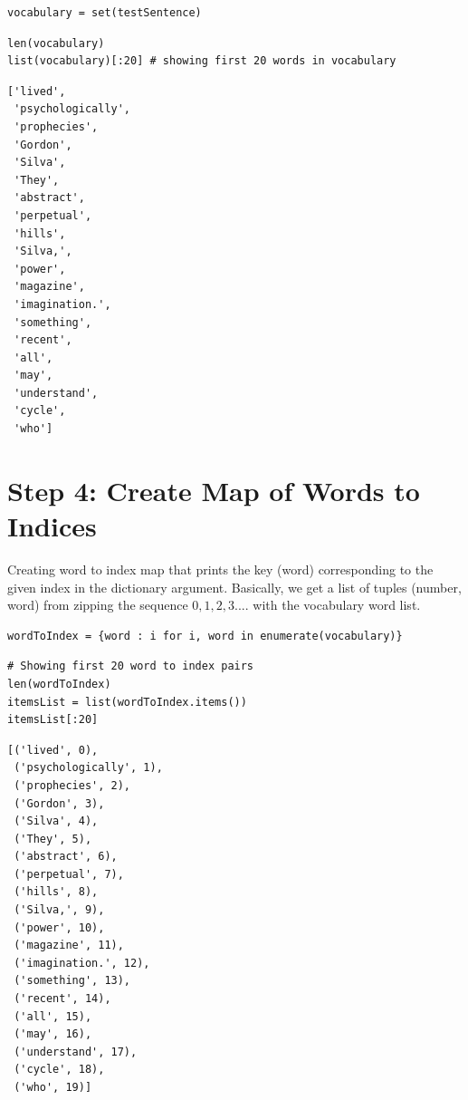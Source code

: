 \documentclass[
]{article}
\begin{document}
\begin{verbatim}
vocabulary = set(testSentence)
\end{verbatim}

\begin{verbatim}
len(vocabulary)
list(vocabulary)[:20] # showing first 20 words in vocabulary
\end{verbatim}

\begin{verbatim}
['lived',
 'psychologically',
 'prophecies',
 'Gordon',
 'Silva',
 'They',
 'abstract',
 'perpetual',
 'hills',
 'Silva,',
 'power',
 'magazine',
 'imagination.',
 'something',
 'recent',
 'all',
 'may',
 'understand',
 'cycle',
 'who']
\end{verbatim}

\hypertarget{step-4-create-map-of-words-to-indices}{%
\section{Step 4: Create Map of Words to
Indices}\label{step-4-create-map-of-words-to-indices}}

Creating word to index map that prints the key (word) corresponding to
the given index in the dictionary argument. Basically, we get a list of
tuples (number, word) from zipping the sequence \(0,1,2,3 ....\) with
the vocabulary word list.

\begin{verbatim}
wordToIndex = {word : i for i, word in enumerate(vocabulary)}
\end{verbatim}

\begin{verbatim}
# Showing first 20 word to index pairs
len(wordToIndex)
itemsList = list(wordToIndex.items())
itemsList[:20]
\end{verbatim}

\begin{verbatim}
[('lived', 0),
 ('psychologically', 1),
 ('prophecies', 2),
 ('Gordon', 3),
 ('Silva', 4),
 ('They', 5),
 ('abstract', 6),
 ('perpetual', 7),
 ('hills', 8),
 ('Silva,', 9),
 ('power', 10),
 ('magazine', 11),
 ('imagination.', 12),
 ('something', 13),
 ('recent', 14),
 ('all', 15),
 ('may', 16),
 ('understand', 17),
 ('cycle', 18),
 ('who', 19)]
\end{verbatim}
\end{document}
